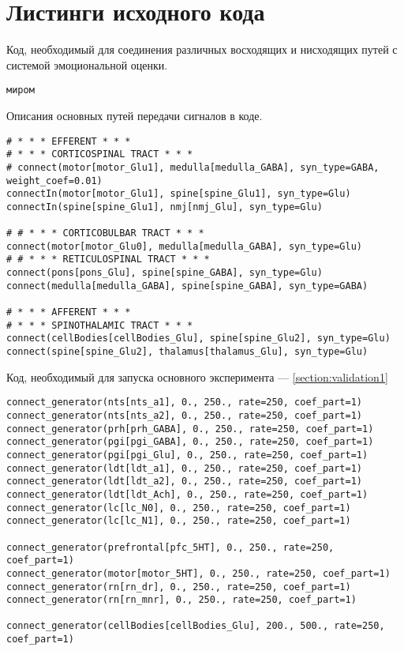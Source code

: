 \chapter{Листинги исходного кода}
\label{app:source_code_listings}

\lstset{ %
	language=Python,                %
	numbers=left,                   %
	stepnumber=1,                   %
	showspaces=false,               
	showstringspaces=false,         
	showtabs=false,                
	tabsize=4,                       %
	breaklines=true,                 %
}
Код, необходимый для соединения различных восходящих и нисходящих путей с системой эмоциональной оценки.
\begin{lstlisting}
миром
\end{lstlisting}

Описания основных путей передачи сигналов в коде.
\begin{lstlisting}
# * * * EFFERENT * * *
# * * * CORTICOSPINAL TRACT * * *
# connect(motor[motor_Glu1], medulla[medulla_GABA], syn_type=GABA, weight_coef=0.01)
connectIn(motor[motor_Glu1], spine[spine_Glu1], syn_type=Glu)
connectIn(spine[spine_Glu1], nmj[nmj_Glu], syn_type=Glu)

# # * * * CORTICOBULBAR TRACT * * *
connect(motor[motor_Glu0], medulla[medulla_GABA], syn_type=Glu)
# # * * * RETICULOSPINAL TRACT * * *
connect(pons[pons_Glu], spine[spine_GABA], syn_type=Glu)
connect(medulla[medulla_GABA], spine[spine_GABA], syn_type=GABA)

# * * * AFFERENT * * *
# * * * SPINOTHALAMIC TRACT * * *
connect(cellBodies[cellBodies_Glu], spine[spine_Glu2], syn_type=Glu)
connect(spine[spine_Glu2], thalamus[thalamus_Glu], syn_type=Glu)
\end{lstlisting}

Код, необходимый для запуска основного эксперимента --- \ref{section:validation1}
\begin{lstlisting}
connect_generator(nts[nts_a1], 0., 250., rate=250, coef_part=1)
connect_generator(nts[nts_a2], 0., 250., rate=250, coef_part=1)
connect_generator(prh[prh_GABA], 0., 250., rate=250, coef_part=1)
connect_generator(pgi[pgi_GABA], 0., 250., rate=250, coef_part=1)
connect_generator(pgi[pgi_Glu], 0., 250., rate=250, coef_part=1)
connect_generator(ldt[ldt_a1], 0., 250., rate=250, coef_part=1)
connect_generator(ldt[ldt_a2], 0., 250., rate=250, coef_part=1)
connect_generator(ldt[ldt_Ach], 0., 250., rate=250, coef_part=1)
connect_generator(lc[lc_N0], 0., 250., rate=250, coef_part=1)
connect_generator(lc[lc_N1], 0., 250., rate=250, coef_part=1)

connect_generator(prefrontal[pfc_5HT], 0., 250., rate=250, coef_part=1)
connect_generator(motor[motor_5HT], 0., 250., rate=250, coef_part=1)
connect_generator(rn[rn_dr], 0., 250., rate=250, coef_part=1)
connect_generator(rn[rn_mnr], 0., 250., rate=250, coef_part=1)

connect_generator(cellBodies[cellBodies_Glu], 200., 500., rate=250, coef_part=1)
\end{lstlisting}